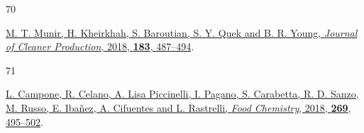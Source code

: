 \documentclass[
  letterpaper,
  DIV=11,
  numbers=noendperiod]{scrartcl}
\newlength{\cslhangindent}
\newlength{\csllabelwidth}
\newenvironment{CSLReferences}[2] %
 {\begin{list}{}{%
  \setlength{\itemindent}{0pt}
  \setlength{\leftmargin}{0pt}
  \setlength{\parsep}{0pt}
  \ifodd #1
   \setlength{\leftmargin}{\cslhangindent}
   \setlength{\itemindent}{-1\cslhangindent}
  \fi
  \setlength{\itemsep}{#2\baselineskip}}}
 {\end{list}}
\newcommand{\CSLLeftMargin}[1]{\parbox[t]{\csllabelwidth}{\strut#1\strut}}
\newcommand{\CSLRightInline}[1]{\parbox[t]{\linewidth - \csllabelwidth}{\strut#1\strut}}
\begin{document}
\begin{CSLReferences}{0}{0}
\CSLLeftMargin{70 }%
\CSLRightInline{\href{https://doi.org/10.1016/j.jclepro.2018.02.166}{M.
T. Munir, H. Kheirkhah, S. Baroutian, S. Y. Quek and B. R. Young,
\emph{Journal of Cleaner Production}, 2018, \textbf{183}, 487--494}.}

\CSLLeftMargin{71 }%
\CSLRightInline{\href{https://doi.org/10.1016/j.foodchem.2018.07.042}{L.
Campone, R. Celano, A. Lisa Piccinelli, I. Pagano, S. Carabetta, R. D.
Sanzo, M. Russo, E. Ibañez, A. Cifuentes and L. Rastrelli, \emph{Food
Chemistry}, 2018, \textbf{269}, 495--502}.}

\end{CSLReferences}
\end{document}
